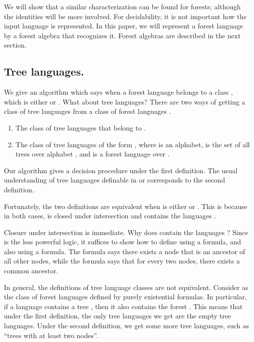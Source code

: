 \documentclass{LMCS}
\begin{document}
We will show that a similar characterization can be found for forests;
although the identities will be more involved.  For decidability, it
is not important how the input language is represented. In this paper,
we will represent a forest language by a forest algebra that
recognizes it.  Forest algebras are described in the next section.

\subsection{Tree languages.}
We give an algorithm which says when a forest language belongs to a class , which is either \Dtwo or \Dtwol.
What about tree languages? There are two ways of getting a class of tree languages from a class of forest languages . 
\begin{enumerate}[(1)]
\item The class of tree languages that belong to .
\item The class of tree languages of the form , where  is an alphabet,   is the set of all trees over alphabet , and  is a forest language over .
\end{enumerate}
Our algorithm gives a decision procedure under the first definition. The usual understanding of  tree languages definable in \Dtwo or \Dtwol corresponds to the second definition.

Fortunately, the two  definitions are equivalent when  is either \Dtwo or \Dtwol. This is because in both cases,    is closed under intersection and contains the languages  .  

Closure under intersection is immediate. Why does  contain the languages ? Since \Dtwo is the less powerful logic, it suffices to show how to define  using a \Stwo formula, and also using a \Ptwo formula. The \Stwo
formula says there exists a node that is an ancestor of all other
nodes, while the \Ptwo formula says that for every two nodes, there
exists a common ancestor. 

In general, the definitions of tree language classes are not equivalent. Consider as  the class of forest languages defined by purely existential formulas. In particular, if a language  contains a tree , then it also contains the forest . This means that under the first definition, the only tree languages we get are the empty tree languages. Under the second definition, we get some more tree languages, such as ``trees with at least two nodes''.
\end{document}
